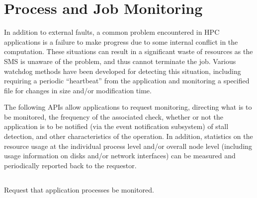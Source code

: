 \section{Process and Job Monitoring}
\label{chap:api_job_mgmt:monitor}

In addition to external faults, a common problem encountered in \ac{HPC} applications is a failure to make
progress due to some internal conflict in the computation. These situations can
result in a significant waste of resources as the \ac{SMS} is unaware of the problem, and thus cannot terminate the
job. Various watchdog methods have been developed for detecting this situation, including requiring a periodic ``heartbeat''
from the application and monitoring a specified file for changes in size and/or modification time.

The following \acp{API} allow applications to request monitoring, directing what is to be monitored, the frequency of the associated check, whether or not the application is to be notified (via the event notification subsystem) of stall detection, and other characteristics of the operation. In addition, statistics on the resource usage at the individual process level and/or overall node level (including usage information on disks and/or network interfaces) can be measured and periodically reported back to the requestor.

\subsection{}

\summary

Request that application processes be monitored.

\format


